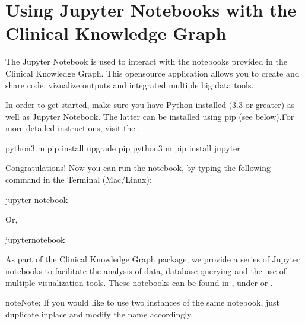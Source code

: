 \documentclass[letterpaper,10pt,english]{sphinxmanual}
\begin{document}
\section{Using Jupyter Notebooks with the Clinical Knowledge Graph}
\label{\detokenize{advanced_features/ckg-notebooks:using-jupyter-notebooks-with-the-clinical-knowledge-graph}}\label{\detokenize{advanced_features/ckg-notebooks::doc}}
The Jupyter Notebook is used to interact with the notebooks provided in the Clinical Knowledge Graph.
This open\sphinxhyphen{}source application allows you to create and share code, vizualize outputs and integrated multiple big data tools.

In order to get started, make sure you have Python installed (3.3 or greater) as well as Jupyter Notebook. The latter can be installed using pip (see below).For more detailed instructions, visit the .

\begin{sphinxVerbatim}[commandchars=\\\{\}]
\PYGZdl{} python3 \PYGZhy{}m pip install \PYGZhy{}\PYGZhy{}upgrade pip
\PYGZdl{} python3 \PYGZhy{}m pip install jupyter
\end{sphinxVerbatim}

Congratulations! Now you can run the notebook, by typing the following command in the Terminal (Mac/Linux):

\begin{sphinxVerbatim}[commandchars=\\\{\}]
\PYGZdl{} jupyter notebook
\end{sphinxVerbatim}

Or,

\begin{sphinxVerbatim}[commandchars=\\\{\}]
\PYGZdl{} jupyter\PYGZhy{}notebook
\end{sphinxVerbatim}

As part of the Clinical Knowledge Graph package, we provide a series of Jupyter notebooks to facilitate the analysis of data, database querying and the use of multiple visualization tools. These notebooks can be found in , under  or .

\begin{sphinxadmonition}{note}{Note:}
If you would like to use two instances of the same notebook, just duplicate inplace and modify the name accordingly.
\end{sphinxadmonition}
\end{document}
